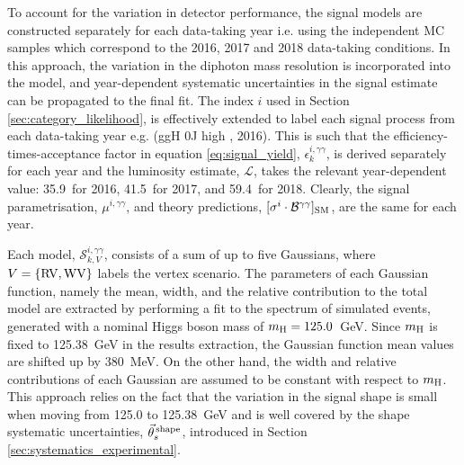 To account for the variation in detector performance, the signal models are constructed separately for each data-taking year i.e. using the independent MC samples which correspond to the 2016, 2017 and 2018 data-taking conditions. In this approach, the variation in the diphoton mass resolution is incorporated into the model, and year-dependent systematic uncertainties in the signal estimate can be propagated to the final fit. The index $i$ used in Section \ref{sec:category_likelihood}, is effectively extended to label each signal process from each data-taking year e.g. (ggH 0J high \ptH, 2016). This is such that the efficiency-times-acceptance factor in equation \ref{eq:signal_yield}, $\epsilon_k^{i,\gamma\gamma}$, is derived separately for each year and the luminosity estimate, $\mathcal{L}$, takes the relevant year-dependent value: 35.9~\fbinv for 2016, 41.5~\fbinv for 2017, and 59.4~\fbinv for 2018. Clearly, the signal parametrisation, $\mu^{i,\gamma\gamma}$, and theory predictions, $[\sigma^i \cdot \mathcal{B}^{\gamma\gamma}]_{\rm{SM}}$, are the same for each year.

Each model, $\mathcal{S}^{i,\gamma\gamma}_{k,V}$, consists of a sum of up to five Gaussians, where $V=\{{\rm{RV}},{\rm{WV}}\}$ labels the vertex scenario. The parameters of each Gaussian function, namely the mean, width, and the relative contribution to the total model are extracted by performing a fit to the \mgg spectrum of simulated events, generated with a nominal Higgs boson mass of $m_{\rm{H}}=125.0$~GeV. 
Since $m_{\rm{H}}$ is fixed to 125.38~GeV in the results extraction, the Gaussian function mean values are shifted up by 380~MeV. On the other hand, the width and relative contributions of each Gaussian are assumed to be constant with respect to $m_{\rm{H}}$.
This approach relies on the fact that the variation in the signal shape is small when moving from 125.0 to 125.38~GeV and is well covered by the shape systematic uncertainties, $\vec{\theta}^{\,\rm{shape}}_s$, introduced in Section \ref{sec:systematics_experimental}.

